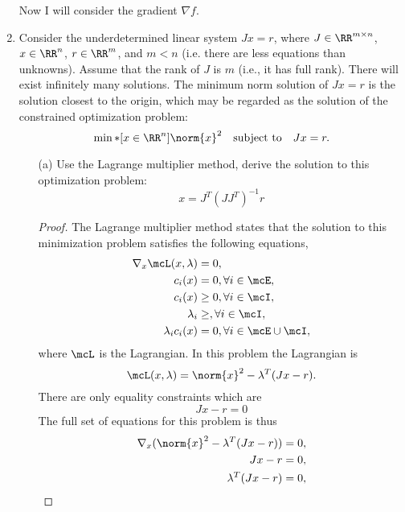 \documentclass[11pt, oneside]{article}
\begin{document}
\begin{enumerate}
    Now I will consider the gradient $\nabla f$.

  \item %
    Consider the underdetermined linear system $Jx = r$, where
    $J \in \RR^{m \times n}$, $x \in \RR^n$, $r \in \RR^m$, and $m < n$
    (i.e. there are less equations than unknowns).
    Assume that the rank of $J$ is $m$ (i.e., it has full rank).
    There will exist infinitely many solutions.
    The minimum norm solution of $Jx = r$ is the solution closest to the origin,
    which may be regarded as the solution of the constrained optimization problem:
    \[
      \min*[x \in \RR^n]{\norm{x}^2} \quad \text{subject to} \quad Jx = r.
    \]
    \begin{enumerate}
      \item[(a)]
        Use the Lagrange multiplier method, derive the solution to this
        optimization problem:
        \[
          x = J^T (J J^T)^{-1} r
        \]

        \begin{proof}
          The Lagrange multiplier method states that the solution to this
          minimization problem satisfies the following equations,
          \begin{align*}
            \nabla_x \mcL(x, \lambda) &= 0, \\
            c_i(x) &= 0, \forall i \in \mcE, \\
            c_i(x) &\ge 0, \forall i \in \mcI, \\
            \lambda_i &\ge, \forall i \in \mcI, \\
            \lambda_i c_i(x) &= 0, \forall i \in \mcE \cup \mcI,
          \end{align*}
          where $\mcL$ is the Lagrangian.
          In this problem the Lagrangian is
          \[
            \mcL(x, \lambda) = \norm{x}^2 - \lambda^T (Jx - r).
          \]
          There are only equality constraints which are
          \[
            Jx - r = 0
          \]
          The full set of equations for this problem is thus
          \begin{align*}
            \nabla_x (\norm{x}^2 - \lambda^T (Jx - r)) &= 0, \\
            Jx - r &= 0, \\
            \lambda^T (Jx - r) &= 0,
          \end{align*}

        \end{proof}


\end{enumerate}
\end{enumerate}
\end{document}

